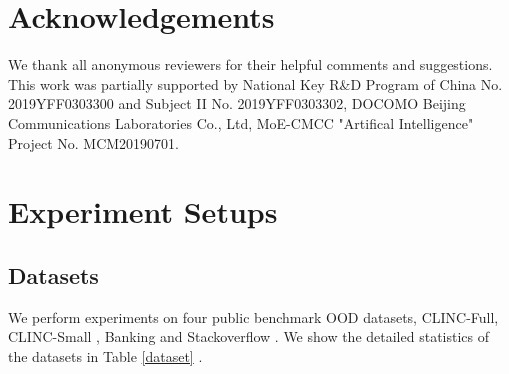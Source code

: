 \documentclass[11pt]{article}
\begin{document}
\section*{Acknowledgements}
We thank all anonymous reviewers for their helpful comments and suggestions. This work was partially supported by National Key R\&D Program of China No. 2019YFF0303300 and Subject II No. 2019YFF0303302, DOCOMO Beijing Communications Laboratories Co., Ltd, MoE-CMCC "Artifical Intelligence" Project No. MCM20190701.







\appendix

\section{Experiment Setups}
\label{setups}

\subsection{Datasets}
We perform experiments on four public benchmark OOD datasets, CLINC-Full, CLINC-Small \cite{Larson2019AnED}, Banking \cite{casanueva2020efficient} and Stackoverflow \cite{xu2015short}. We show the detailed statistics of the datasets in Table \ref{dataset} .

\begin{table}[h]
\centering
{}
\caption{Statistics of the CLINC datasets.}
\vspace{-0.5cm}
\label{dataset}
\end{table}
\end{document}
